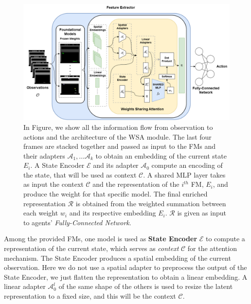 \begin{figure}[ht]
    \begin{center}
        \includegraphics[width=1\textwidth]{images/wsa_main_architecture}
    \end{center}
    \caption{In Figure, we show all the information flow from observation to actions and the architecture of the WSA module. The last four frames are stacked together and passed as input to the FMs and their adapters $\mathcal{A}_1, \dots \mathcal{A}_k$ to obtain an embedding of the current state $E_i$. A State Encoder $\mathcal{E}$ and its adapter $\mathcal{A}_0$ compute an encoding of the state, that will be used as context $\mathcal{C}$. A shared MLP layer takes as input the context $\mathcal{C}$ and the representation of the $i^{th}$ FM, $E_i$, and produce the weight for that specific model. The final enriched representation $\mathcal{R}$ is obtained from the weighted summation between each weight $w_i$ and its respective embedding $E_i$. $\mathcal{R}$ is given as input to agents' \textit{Fully-Connected Network}.}
    \label{fig:wsa_main_architecture}
\end{figure}


Among the provided FMs, one model is used as \textbf{State Encoder} $\mathcal{E}$ to compute a representation of the current state, which serves as \textit{context} $\mathcal{C}$ for the attention mechanism.
The State Encoder produces a spatial embedding of the current observation.
Here we do not use a spatial adapter to preprocess the output of the State Encoder, we just flatten the representation to obtain a linear embedding.
A linear adapter $\mathcal{A}^{l}_0$ of the same shape of the others is used to resize the latent representation to a fixed size, and this will be the context $\mathcal{C}$.

